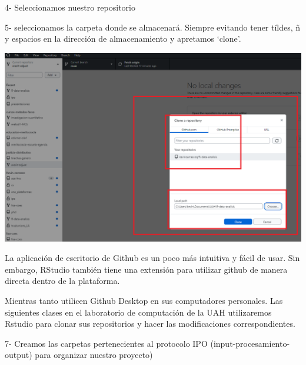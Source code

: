 \documentclass[
  letterpaper,
  DIV=11,
  numbers=noendperiod]{scrartcl}
\begin{document}
4- Seleccionamos nuestro repositorio

5- seleccionamos la carpeta donde se almacenará. Siempre evitando tener
tíldes, ñ y espacios en la dirección de almacenamiento y apretamos
`clone'.

\includegraphics{images/clonar2.png}

\begin{tcolorbox}[enhanced jigsaw, opacitybacktitle=0.6, colframe=quarto-callout-note-color-frame, breakable, toprule=.15mm, bottomrule=.15mm, toptitle=1mm, colback=white, bottomtitle=1mm, rightrule=.15mm, title=\textcolor{quarto-callout-note-color}{\faInfo}\hspace{0.5em}{Note}, leftrule=.75mm, coltitle=black, opacityback=0, titlerule=0mm, arc=.35mm, left=2mm, colbacktitle=quarto-callout-note-color!10!white]

La aplicación de escritorio de Github es un poco más intuitiva y fácil
de usar. Sin embargo, RStudio también tiene una extensión para utilizar
github de manera directa dentro de la plataforma.

Mientras tanto utilicen Github Desktop en sus computadores personales.
Las siguientes clases en el laboratorio de computación de la UAH
utilizaremos Rstudio para clonar sus repositorios y hacer las
modificaciones correspondientes.

\end{tcolorbox}

7- Creamos las carpetas pertenecientes al protocolo IPO
(input-procesamiento-output) para organizar nuestro proyecto)
\end{document}
